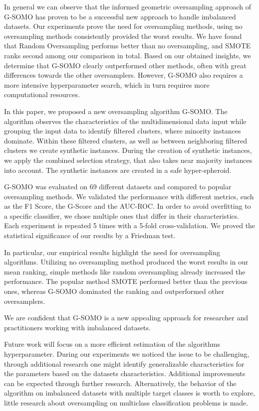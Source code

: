 \documentclass[parskip=full]{scrartcl}
\begin{document}
In general we can observe that the informed geometric oversampling approach of G-SOMO has proven to be a successful new approach to handle imbalanced datasets. Our experiments prove the need for oversampling methods, using no oversampling methods consistently provided the worst results. We have found that Random Oversampling performs better than no oversampling, and SMOTE ranks second among our comparison in total. Based on our obtained insights, we determine that G-SOMO clearly outperformed other methods, often with great differences towards the other oversamplers. However, G-SOMO also requires a more intensive hyperparameter search, which in turn requires more computational resources. 

\newpage
{}

In this paper, we proposed a new oversampling algorithm G-SOMO. The algorithm observes the characteristics of the multidimensional data input while grouping the input data to identify filtered clusters, where minority instances dominate. Within these filtered clusters, as well as between neighboring filtered clusters we create synthetic instances. During the creation of synthetic instances, we apply the combined selection strategy, that also takes near majority instances into account. The synthetic instances are created in a safe hyper-spheroid. 

G-SOMO was evaluated on 69 different datasets and compared to popular oversampling methods. We validated the performance with different metrics, such as the F1 Score, the G-Score and the AUC-ROC. In order to avoid overfitting to a specific classifier, we chose multiple ones that differ in their characteristics. Each experiment is repeated 5 times with a 5-fold cross-validation. We proved the statistical significance of our results by a Friedman test.

In particular, our empirical results highlight the need for oversampling algorithms. Utilizing no oversampling method produced the worst results in our mean ranking, simple methods like random oversampling already increased the performance. The popular method SMOTE performed better than the previous ones, whereas G-SOMO dominated the ranking and outperformed other oversamplers. 

We are confident that G-SOMO is a new appealing approach for researcher and practitioners working with imbalanced datasets. 

Future work will focus on a more efficient estimation of the algorithms hyperparameter. During our experiments we noticed the issue to be challenging, through additional research one might identify generalizable characteristics for the parameters based on the datasets characteristics. Additional improvements can be expected through further research. Alternatively, the behavior of the algorithm on imbalanced datasets with multiple target classes is worth to explore, little research about oversampling on multiclass classification problems is made. 
\newpage
\headingFont{}

\end{document}
